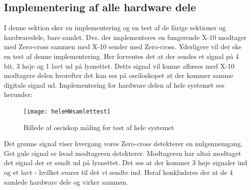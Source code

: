 \documentclass[11pt]{article}
\begin{document}
\subsection{Implementering af alle hardware dele}
I denne sektion sker en implementering og en test af de fårige sektioner og hardwaredele, bare samlet. Dvs. der implementeres en fungerende X-10 modtager med Zero-cross sammen med X-10 sender med Zero-cross. Yderligere vil der ske en test af denne implementering. Her forventes det at der sendes et signal på 4 bit, 3 høje og 1 lavt ud på lysnettet. Dette signal vil kunne aflæses med X-10 modtagere delen hvorefter det kan ses på osciloskopet at der kommer samme digitale signal ud. Implementering for hardware delen af hele systemet ses herunder:
\begin{figure}[H]
	\centering
	\texttt{[image: heleHWsamlettest]}
	\caption{Billede af osciskop måling for test af hele systemet}
	\label{bil:OscTestHeleSys}
\end{figure}
Det grønne signal viser hvergang vores Zero-cross detekterer en nulgennemgang. Get gule signal er hvad modtageren detekterer. Modtageren har altså modtaget det signal der er sendt ud på lysnettet. Det ses at der kommer 3 høje signaler ind og et lavt - hvilket svarer til det vi sendte ind. Heraf konkluderes der at de 4 samlede hardware dele og virker sammen.
\end{document}
